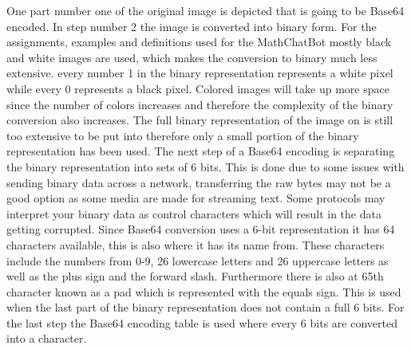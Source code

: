 \noindent
One part number one of  the original image is depicted that is going to be Base64 encoded. In step number 2 the image is converted into binary form. For the assignments, examples and definitions used for the MathChatBot mostly black and white images are used, which makes the conversion to binary much less extensive. every number 1 in the binary representation represents a white pixel while every 0 represents a black pixel. Colored images will take up more space since the number of colors increases and therefore the complexity of the binary conversion also increases. The full binary representation of the image on  is still too extensive to be put into  therefore only a small portion of the binary representation has been used. The next step of a Base64 encoding is separating the binary representation into sets of 6 bits. This is done due to some issues with sending binary data across a network, transferring the raw bytes may not be a good option as some media are made for streaming text. Some protocols may interpret your binary data as control characters which will result in the data getting corrupted. Since Base64 conversion uses a 6-bit representation it has 64 characters available, this is also where it has its name from. These characters include the numbers from 0-9, 26 lowercase letters and 26 uppercase letters as well as the plus sign and the forward slash. Furthermore there is also at 65th character known as a pad which is represented with the equals sign. This is used when the last part of the binary representation does not contain a full 6 bits. For the last step the Base64 encoding table is used where every 6 bits are converted into a character\cite{HeinzTschabitscher2019HowWorks}.

